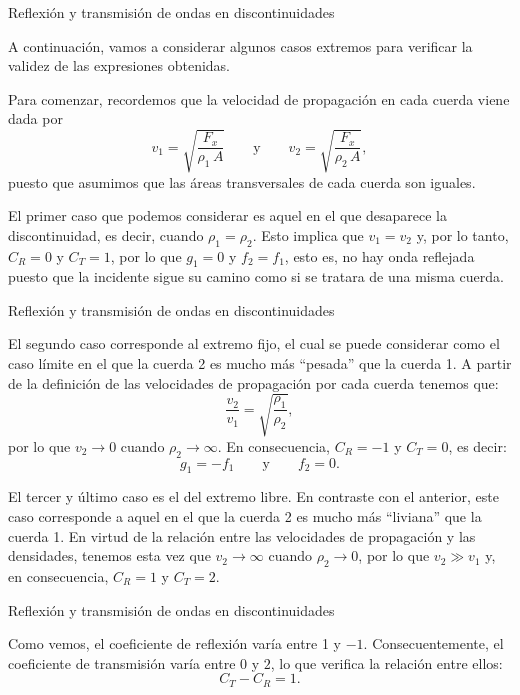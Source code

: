 \documentclass[11pt,handout,aspectratio=1610]{beamer}
\newcommand{\vs}{\vspace{11pt}}
\begin{document}
\begin{frame}{Reflexión y transmisión de ondas en discontinuidades}

    A continuación, vamos a considerar algunos casos extremos para verificar la validez de las expresiones obtenidas.

    \vs

    Para comenzar, recordemos que la velocidad de propagación en cada cuerda viene dada por $$ v_1 = \sqrt{\frac{F_x}{\rho_1 \, A}} \qquad \text{y} \qquad v_2 = \sqrt{\frac{F_x}{\rho_2 \, A}}, $$ puesto que asumimos que las áreas transversales de cada cuerda son iguales.

    \vs 

    El primer caso que podemos considerar es aquel en el que desaparece la discontinuidad, es decir, cuando $\rho_1 = \rho_2$. Esto implica que $v_1 = v_2$ y, por lo tanto, $C_R = 0$ y $C_T = 1$, por lo que $g_1 = 0$ y $f_2 = f_1$, esto es, no hay onda reflejada puesto que la incidente sigue su camino como si se tratara de una misma cuerda.

\end{frame}

\begin{frame}{Reflexión y transmisión de ondas en discontinuidades}

    El segundo caso corresponde al extremo fijo, el cual se puede considerar como el caso límite en el que la cuerda 2 es mucho más ``pesada'' que la cuerda 1. A partir de la definición de las velocidades de propagación por cada cuerda tenemos que: $$ \frac{v_2}{v_1} = \sqrt{\frac{\rho_1}{\rho_2}},$$ por lo que $v_2 \to 0$ cuando $\rho_2 \to \infty$. En consecuencia, $C_R = -1$ y $C_T = 0$, es decir: $$ g_1 = - f_1 \qquad \text{y} \qquad f_2 = 0. $$ 

    El tercer y último caso es el del extremo libre. En contraste con el anterior, este caso corresponde a aquel en el que la cuerda 2 es mucho más ``liviana'' que la cuerda 1. En virtud de la relación entre las velocidades de propagación y las densidades, tenemos esta vez que $v_2 \to \infty$ cuando $\rho_2 \to 0$, por lo que $v_2 \gg v_1 $ y, en consecuencia, $C_R = 1 $ y $ C_T = 2$.

\end{frame}

\begin{frame}{Reflexión y transmisión de ondas en discontinuidades}

    Como vemos, el coeficiente de reflexión varía entre 1 y $-1$. Consecuentemente, el coeficiente de transmisión varía entre $0$ y $2$, lo que verifica la relación entre ellos: $$ C_T - C_R = 1.$$

\end{frame}
\end{document}
